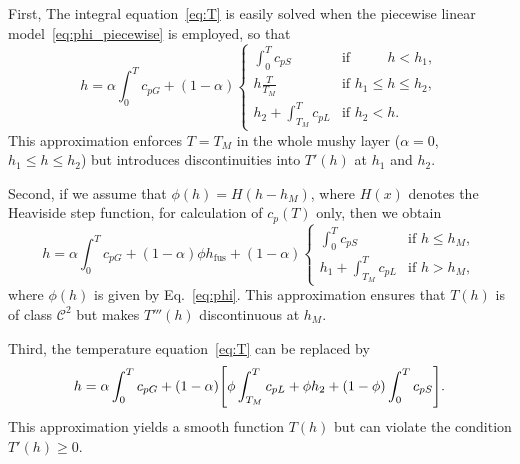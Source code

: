 \documentclass{article}
\newcommand{\fusion}[1]{{#1}_\mathrm{fus}}
\begin{document}
First, The integral equation~\eqref{eq:T} is easily solved
when the piecewise linear model~\eqref{eq:phi_piecewise} is employed, so that
\begin{equation}\label{eq:h_piecewise}
    h = \alpha \int_0^T c_{pG} + (1-\alpha)\begin{cases}
        \int_0^T c_{pS}           &\text{if }\qquad\,\, h < h_1, \\
        h\frac{T}{T_M}            &\text{if } h_1 \leq h \leq h_2, \\
        h_2 + \int_{T_M}^T c_{pL} &\text{if } h_2 < h.
    \end{cases}
\end{equation}
This approximation enforces $T=T_M$ in the whole mushy layer
($\alpha=0$, $h_1 \leq h \leq h_2$)
but introduces discontinuities into $T'(h)$ at $h_1$ and $h_2$.

Second, if we assume that $\phi(h) = H(h-h_M)$, where $H(x)$ denotes the Heaviside step function,
for calculation of $c_p(T)$ only, then we obtain
\begin{equation}\label{eq:h_piecewise2}
    h = \alpha \int_0^T c_{pG}
        + (1-\alpha)\phi\fusion{h} + (1-\alpha)
    \begin{cases}
        \int_0^T c_{pS}           &\text{if } h \leq h_M, \\
        h_1 + \int_{T_M}^T c_{pL} &\text{if } h > h_M,
    \end{cases}
\end{equation}
where $\phi(h)$ is given by Eq.~\eqref{eq:phi}.
This approximation ensures that $T(h)$ is of class $\mathcal{C}^2$
but makes $T'''(h)$ discontinuous at $h_M$.

Third, the temperature equation~\eqref{eq:T} can be replaced by
\begin{equation}\label{eq:h_smooth}
    h = \alpha \int_0^T c_{pG} + (1-\alpha)
        \qty[ \phi\int_{T_M}^T c_{pL}+ \phi h_2 + (1-\phi)\int_0^T c_{pS} ].
\end{equation}
This approximation yields a smooth function $T(h)$ but can violate the condition $T'(h)\geq0$.
\end{document}
